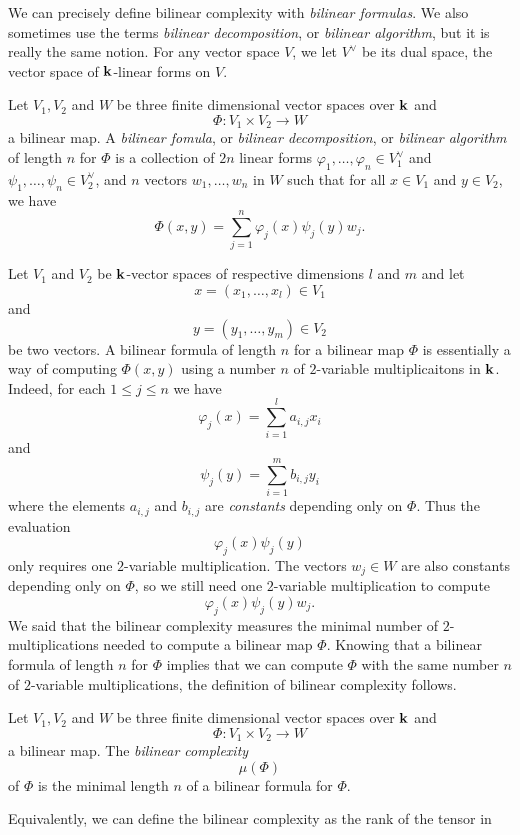 We can precisely define bilinear complexity with \emph{bilinear formulas}. We
also sometimes use the terms \emph{bilinear decomposition}, or \emph{bilinear
algorithm}, but it is really the same notion. For any vector space $V$, we let
$V^\vee$ be its dual space, \ie the vector space of $\mathbf{k}$-linear forms on $V$.
\begin{defi}
  \label{defi:bilinear-formula}
  Let $V_1, V_2$ and $W$ be three finite dimensional vector spaces over $\mathbf{k}$ and 
  \[
    \Phi:V_1\times V_2\to W
  \]
  a bilinear map. A \emph{bilinear fomula}, or \emph{bilinear decomposition}, or
  \emph{bilinear algorithm} of length $n$ for $\Phi$ is a
  collection of $2n$ linear forms $\varphi_1, \dots, \varphi_n\in V_1^\vee$ and $\psi_1,
  \dots, \psi_n\in V_2^\vee$, and $n$ vectors $w_1, \dots, w_n$ in $W$ such that for all
  $x\in V_1$ and $y\in V_2$, we have
  \[
    \Phi(x, y) = \sum_{j=1}^n \varphi_j(x)\psi_j(y)w_j.
  \]
\end{defi}
Let $V_1$ and $V_2$ be $\mathbf{k}$-vector spaces of respective dimensions $l$ and $m$
and let
\[
  x = (x_1, \dots, x_l)\in V_1
\]
and
\[
  y = (y_1, \dots, y_m)\in V_2
\]
be two vectors.
A bilinear formula of length $n$ for a bilinear map $\Phi$ is essentially a way
of computing $\Phi(x, y)$ using a number $n$ of $2$-variable multiplicaitons in $\mathbf{k}$.
Indeed, for each $1\leq j \leq n$ we have
\[
  \varphi_j(x) = \sum_{i=1}^l a_{i, j}x_i
\]
and
\[
  \psi_j(y) = \sum_{i=1}^m b_{i, j}y_i
\]
where the elements $a_{i, j}$ and $b_{i, j}$ are \emph{constants} depending only
on $\Phi$. Thus the evaluation
\[
  \varphi_j(x)\psi_j(y)
\]
only requires one $2$-variable multiplication. The vectors $w_j\in W$ are also
constants depending only on $\Phi$, so we still need one $2$-variable
multiplication to compute 
\[
  \varphi_j(x)\psi_j(y)w_j.
\]
We said that the bilinear complexity measures the minimal number of
$2$-multiplications needed to compute a bilinear map $\Phi$. Knowing that a
bilinear formula of length $n$ for $\Phi$ implies that we can compute $\Phi$
with the same number $n$ of $2$-variable multiplications, the definition of
bilinear complexity follows.
\begin{defi}
  Let $V_1, V_2$ and $W$ be three finite dimensional vector spaces over $\mathbf{k}$ and 
  \[
    \Phi:V_1\times V_2\to W
  \]
  a bilinear map. The \emph{bilinear complexity} 
  \[
    \mu(\Phi)
  \]
  of $\Phi$ is the minimal length $n$ of a bilinear formula for $\Phi$.
\end{defi}
Equivalently, we can define the bilinear complexity as the rank of the tensor in 
